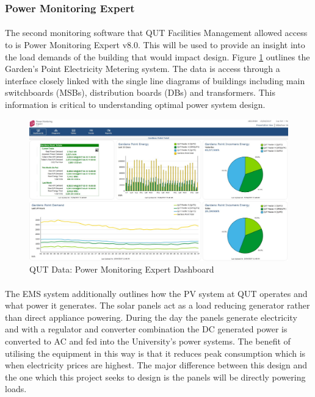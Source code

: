 \subsubsection{Power Monitoring Expert}

\paragraph{}
The second monitoring software that QUT Facilities Management allowed access to is Power Monitoring Expert v8.0. This will be used to provide an insight into the load demands of the building that would impact design. Figure \ref{fig:qut-summary-dashboard} outlines the Garden's Point Electricity Metering system. The data is access through a interface closely linked with the single line diagrams of buildings including main switchboards (MSBs), distribution boards (DBs) and transformers. This information is critical to understanding optimal power system design.   

\begin{figure}[H]
	\hfill\includegraphics[width = 150mm]{images/metering/pme/summary-dashboard}\hspace*{\fill}
	\caption{QUT Data: Power Monitoring Expert Dashboard} 
	\label{fig:qut-summary-dashboard}
\end{figure}

\paragraph{}
The EMS system additionally outlines how the PV system at QUT operates and what power it generates. The solar panels act as a load reducing generator rather than direct appliance powering. During the day the panels generate electricity and with a regulator and converter combination the DC generated power is converted to AC and fed into the University's power systems. The benefit of utilising the equipment in this way is that it reduces peak consumption which is when electricity prices are highest. The major difference between this design and the one which this project seeks to design is the panels will be directly powering loads.

